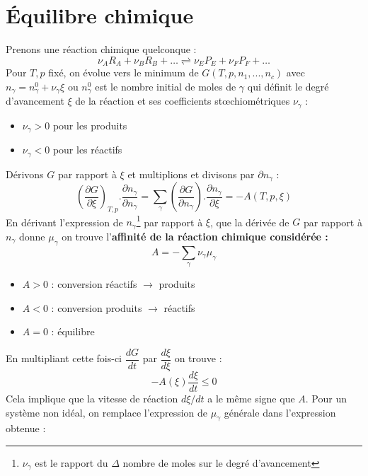 \documentclass[british,french,11pt, a4paper, openany]{book}
\begin{document}
	\section{Équilibre chimique}
	Prenons une réaction chimique quelconque : 
	\begin{equation}
	\nu_A R_A + \nu_B R_B + \dots \rightleftharpoons \nu_E P_E + \nu_F P_F + \dots
	\end{equation}
	Pour $T, p$ fixé, on évolue vers le minimum de $G(T,p,n_1, ..., n_c)$ avec $n_\gamma = n_\gamma^0 + \nu_\gamma\xi$ ou $n_\gamma^0$ est le nombre initial de moles de $\gamma$ qui définit le degré d'avancement $\xi$ de la réaction et ses coefficients stœchiométriques $\nu_\gamma$ :
	\begin{itemize}
		\item $\nu_\gamma > 0$ pour les produits
		\item $\nu_\gamma < 0$ pour les réactifs
	\end{itemize}
	Dérivons $G$ par rapport à $\xi$ et multiplions et divisons par $\partial n_\gamma$ :
	\begin{equation}
	\left(\frac{\partial G}{\partial\xi}\right)_{T,p} . \frac{\partial n_\gamma}{\partial n_\gamma} = \sum_\gamma \left(\frac{\partial G}{\partial n_\gamma}\right).\frac{\partial n_\gamma}{\partial\xi} = -A(T,p,\xi)
	\end{equation}
	En dérivant l'expression de $n_\gamma$\footnote{$\nu_\gamma$ est le rapport du $\Delta$ nombre de moles sur le degré d'avancement} par rapport à $\xi$, que la dérivée de $G$ par rapport à $n_\gamma$ donne $\mu_\gamma$ on trouve l'\textbf{affinité de la réaction chimique considérée :}
	\begin{equation}
	A = - \sum_\gamma \nu_\gamma \mu_\gamma
	\end{equation}
	\begin{itemize}
		\item $A > 0$ : conversion réactifs $\rightarrow$ produits
		\item $A < 0$ : conversion produits $\rightarrow$ réactifs
		\item $A = 0$ : équilibre
	\end{itemize}
	En multipliant cette fois-ci $\dfrac{dG}{dt}$ par $\dfrac{d\xi}{d\xi}$ on trouve :
	\begin{equation}
	-A(\xi)\frac{d\xi}{dt} \leq 0
	\end{equation}
	Cela implique que la vitesse de réaction $d\xi/dt$ a le même signe que $A$. Pour un système non idéal, on remplace l'expression de $\mu_\gamma$ générale dans l'expression obtenue :
\end{document}

